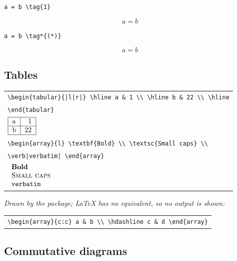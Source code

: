 \documentclass[9pt]{extarticle}
\begin{document}
{\small\verb|a = b \tag{1}|}

\[a = b \tag{1}\]

{\small\verb|a = b \tag*{(*)}|}

\[a = b \tag*{(*)}\]

\subsection*{Tables}

\begin{tabular}{@{}l@{}}
{\small\verb!\begin{tabular}{|l|r|} \hline a & 1 \\ \hline b & 22 \\ \hline!} \\ {\small\verb|\end{tabular}|} \\ {\large $\begin{tabular}{|l|r|} \hline a & 1 \\ \hline b & 22 \\ \hline \end{tabular}
$} \\[4pt]
{\small\verb|\begin{array}{l} \textbf{Bold} \\ \textsc{Small caps} \\|} \\ {\small\verb!\verb|verbatim| \end{array}!} \\ {\large $\begin{array}{l} \textbf{Bold} \\ \textsc{Small caps} \\ \verb|verbatim| \end{array}
$} \\[4pt]
\end{tabular}

{\small\itshape Drawn by the package; LaTeX has no equivalent, so no output is shown:}

\begin{tabular}{@{}l@{}}
{\small\verb|\begin{array}{c:c} a & b \\ \hdashline c & d \end{array}|} \\
\end{tabular}

\newpage
\subsection*{Commutative diagrams}
\end{document}
